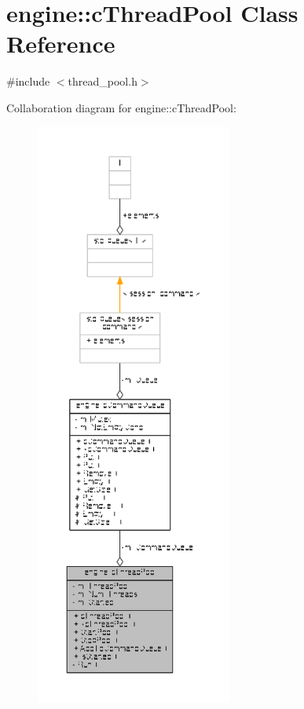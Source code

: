 \hypertarget{classengine_1_1cThreadPool}{\section{engine\-:\-:c\-Thread\-Pool Class Reference}
\label{classengine_1_1cThreadPool}
}


{\ttfamily \#include $<$thread\-\_\-pool.\-h$>$}



Collaboration diagram for engine\-:\-:c\-Thread\-Pool\-:
\nopagebreak
\begin{figure}[H]
\begin{center}
\leavevmode
\includegraphics[height=550pt]{classengine_1_1cThreadPool__coll__graph}
\end{center}
\end{figure}
